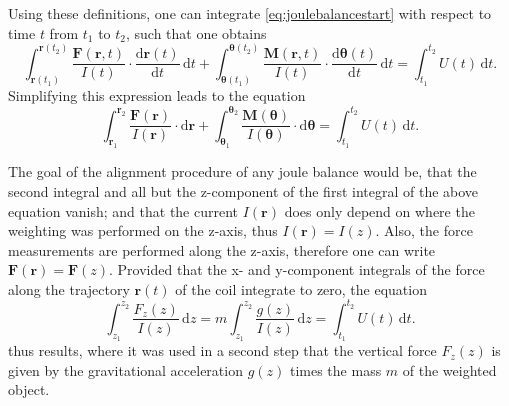\documentclass{report}
\numberwithin{tm}{section}
\newcommand\vect[1]{\ensuremath{\bm{#1}}}
\begin{document}
Using these definitions, one can integrate \cref{eq:joulebalancestart} with respect to time $t$ from $t_1$ to $t_2$, such that one obtains \begin{equation}
	\int_{\vect{r}(t_1)}^{\vect{r}(t_2)}\frac{\vect{F}(\vect{r},t)}{I(t)}\cdot \frac{\mathrm{d}\vect{r}(t)}{\mathrm{d}t}\,\mathrm{d}t + \int_{\vect{\theta}(t_1)}^{\vect{\theta}(t_2)}\frac{\vect{M}(\vect{r},t)}{I(t)}\cdot \frac{\mathrm{d}\vect{\theta}(t)}{\mathrm{d}t}\,\mathrm{d}t = \int_{t_1}^{t_2}U(t)\,\mathrm{d}t.
\end{equation} Simplifying this expression leads to the equation \begin{equation}
\int_{\vect{r}_1}^{\vect{r}_2}\frac{\vect{F}(\vect{r})}{I(\vect{r})}\cdot \mathrm{d}\vect{r} + \int_{\vect{\theta}_1}^{\vect{\theta}_2}\frac{\vect{M}(\vect{\theta})}{I(\vect{\theta})}\cdot \mathrm{d}\vect{\theta} = \int_{t_1}^{t_2}U(t)\,\mathrm{d}t.
\end{equation} 

The goal of the alignment procedure of any joule balance would be, that the second integral and all but the z-component of the first integral of the above equation vanish; and that the current $I(\vect{r})$ does only depend on where the weighting was performed on the z-axis, thus $I(\vect{r}) = I(z)$. Also, the force measurements are performed along the z-axis, therefore one can write $\vect{F}(\vect{r}) = \vect{F}(z)$. Provided that the x- and y-component integrals of the force along the trajectory $\vect{r}(t)$ of the coil integrate to zero, the equation \begin{equation}\label{eq:joule_first_int_equation}
	\int_{z_1}^{z_2} \frac{F_z(z)}{I(z)}\,\mathrm{d}z = m\int_{z_1}^{z_2} \frac{g(z)}{I(z)}\,\mathrm{d}z = \int_{t_1}^{t_2}U(t)\,\mathrm{d}t.
\end{equation} thus results, where it was used in a second step that the vertical force $F_z(z)$ is given by the gravitational acceleration $g(z)$ times the mass $m$ of the weighted object.
\end{document}
